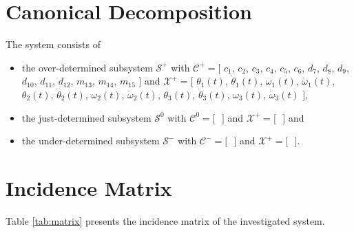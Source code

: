 \documentclass[a4,11pt]{article}
\begin{document}
\section{Canonical Decomposition}The system consists of
\begin{itemize}	\item the over-determined subsystem $\mathcal{S}^+$ with $\mathcal{C}^+ = [$ $c_1$, $c_2$, $c_3$, $c_4$, $c_5$, $c_6$, $d_7$, $d_8$, $d_9$, $d_{10}$, $d_{11}$, $d_{12}$, $m_{13}$, $m_{14}$, $m_{15} $ $]$ and $\mathcal{X}^+ = [$ $\theta_1\left(t\right)$, $\dot{\theta}_1\left(t\right)$, $\omega_1\left(t\right)$, $\dot{\omega}_1\left(t\right)$, $\theta_2\left(t\right)$, $\dot{\theta}_2\left(t\right)$, $\omega_2\left(t\right)$, $\dot{\omega}_2\left(t\right)$, $\theta_3\left(t\right)$, $\dot{\theta}_3\left(t\right)$, $\omega_3\left(t\right)$, $\dot{\omega}_3\left(t\right) $ $]$,
	\item the just-determined subsystem $\mathcal{S}^0$ with $\mathcal{C}^0 = [$ $ $ $]$ and $\mathcal{X}^+ = [$ $ $ $]$ and
	\item the under-determined subsystem $\mathcal{S}^-$ with $\mathcal{C}^- = [$ $ $ $]$ and $\mathcal{X}^+ = [$ $ $ $]$.
\end{itemize}
\section{Incidence Matrix}
Table \ref{tab:matrix} presents the incidence matrix of the investigated system.\setlength\tabcolsep{2mm}
\end{document}
